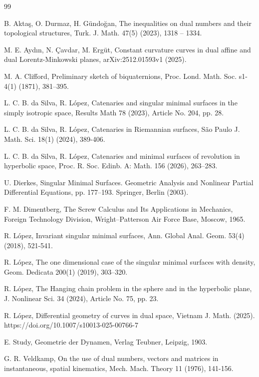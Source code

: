 \documentclass[a4paper,12pt]{amsart}
\theoremstyle{definition}
\begin{document}
\begin{thebibliography}{99}

 B. Akta{\c{s}}, O. Durmaz, H. G{\"u}ndo{\u{g}}an, The inequalities on dual numbers and their topological structures, Turk. J. Math. 47(5) (2023), 1318 – 1334.

 M. E. Ayd{\i}n, N. \c{C}avdar, M. Erg\"ut, Constant curvature curves in dual affine and dual Lorentz-Minkowski planes, arXiv:2512.01593v1 (2025).


 M. A. Clifford, Preliminary sketch of biquaternions, Proc. Lond. Math. Soc. s1-4(1) (1871), 381–395.

 L. C. B. da Silva, R. L\'opez, Catenaries and singular minimal surfaces in the simply isotropic space, Results Math 78 (2023), Article No. 204, pp. 28.

 L. C. B. da Silva, R. L\'opez, Catenaries in Riemannian surfaces, S\~ao Paulo J. Math. Sci. 18(1) (2024), 389-406.

 L. C. B. da Silva, R. L\'opez, Catenaries and minimal surfaces of revolution in hyperbolic space, Proc. R. Soc. Edinb. A: Math. 156 (2026), 263–283.

 U. Dierkes, Singular Minimal Surfaces. Geometric Analysis and Nonlinear Partial Differential Equations,
pp. 177–193. Springer, Berlin (2003).

 F. M. Dimentberg, The Screw Calculus and Its Applications in Mechanics, Foreign Technology Division, Wright–Patterson Air Force Base, Moscow, 1965.

 R. L\'opez, Invariant singular minimal surfaces, Ann. Global Anal. Geom. 53(4) (2018), 521-541.

 R. L\'opez, The one dimensional case of the singular minimal surfaces
with density, Geom. Dedicata 200(1) (2019), 303–320.
 
 R. L\'opez, The Hanging chain problem in the sphere and in the hyperbolic plane, J. Nonlinear Sci. 34 (2024), Article No. 75, pp. 23.

 R. L\'opez, Differential geometry of curves in dual space, Vietnam J. Math. (2025). https://doi.org/10.1007/s10013-025-00766-7

 E. Study, Geometrie der Dynamen, Verlag Teubner, Leipzig, 1903.

 G. R. Veldkamp, On the use of dual numbers, vectors and matrices in instantaneous, spatial kinematics, Mech. Mach. Theory 11 (1976), 141-156.


\end{thebibliography}
\end{document}
